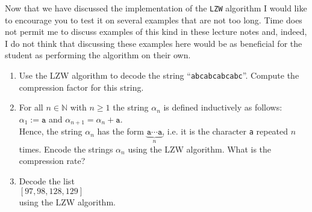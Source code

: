 Now that we have discussed the implementation of the \texttt{LZW} algorithm I would like to
encourage you to test it on several examples that are not too long.  Time does not permit me
to discuss examples of this kind in these lecture notes and, indeed, I do not think that discussing
these examples here would be as beneficial for the student as performing the algorithm on their own.

\exercise
\begin{enumerate}
\item Use the LZW algorithm to decode the string ``\texttt{abcabcabcabc}''.  Compute the compression
      factor for this string.
\item For all $n \in \mathbb{N}$ with $n \geq 1$ the string $\alpha_n$ is defined inductively as
      follows:
      \\[0.2cm]
      \hspace*{1.3cm} $\alpha_1 := \mathtt{a}$ \quad and \quad $\alpha_{n+1} = \alpha_n + \mathtt{a}$.
      \\[0.2cm]
      Hence, the string $\alpha_n$ has the form $\underbrace{\mathtt{a} \cdots \mathtt{a}}_n$,
      i.e. it is the character \texttt{a} repeated $n$ times.
      Encode the strings $\alpha_n$ using the LZW algorithm.  What is the compression rate?
\item Decode the list 
      \\[0.2cm]
      \hspace*{1.3cm}
      $[97, 98, 128, 129]$
      \\[0.2cm]
      using the LZW algorithm.
\end{enumerate}

